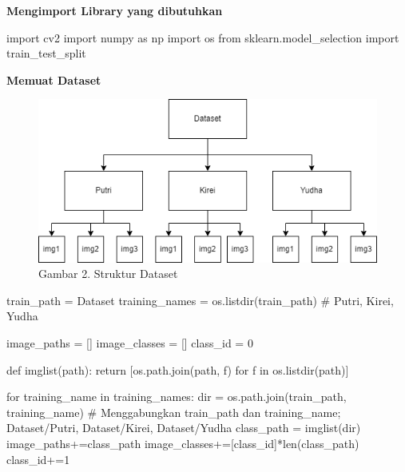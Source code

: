 \documentclass[
  letterpaper,
  DIV=11,
  numbers=noendperiod]{scrreprt}
\newenvironment{Shaded}{\begin{snugshade}}{\end{snugshade}}
\newcommand{\BuiltInTok}[1]{\textcolor[rgb]{0.00,0.23,0.31}{#1}}
\newcommand{\CommentTok}[1]{\textcolor[rgb]{0.37,0.37,0.37}{#1}}
\newcommand{\ControlFlowTok}[1]{\textcolor[rgb]{0.00,0.23,0.31}{#1}}
\newcommand{\DecValTok}[1]{\textcolor[rgb]{0.68,0.00,0.00}{#1}}
\newcommand{\ImportTok}[1]{\textcolor[rgb]{0.00,0.46,0.62}{#1}}
\newcommand{\KeywordTok}[1]{\textcolor[rgb]{0.00,0.23,0.31}{#1}}
\newcommand{\NormalTok}[1]{\textcolor[rgb]{0.00,0.23,0.31}{#1}}
\newcommand{\OperatorTok}[1]{\textcolor[rgb]{0.37,0.37,0.37}{#1}}
\newcommand{\StringTok}[1]{\textcolor[rgb]{0.13,0.47,0.30}{#1}}
\begin{document}
\textbf{Mengimport Library yang dibutuhkan}

\begin{Shaded}
\begin{Highlighting}[]
\ImportTok{import}\NormalTok{ cv2}
\ImportTok{import}\NormalTok{ numpy }\ImportTok{as}\NormalTok{ np}
\ImportTok{import}\NormalTok{ os}
\ImportTok{from}\NormalTok{ sklearn.model\_selection }\ImportTok{import}\NormalTok{ train\_test\_split}
\end{Highlighting}
\end{Shaded}

\textbf{Memuat Dataset}

\begin{figure}

{\centering \includegraphics{Asset/strukturdataset.png}

}

\caption{Gambar 2. Struktur Dataset}

\end{figure}

\begin{Shaded}
\begin{Highlighting}[]
\NormalTok{train\_path }\OperatorTok{=} \StringTok{\textquotesingle{}Dataset\textquotesingle{}}
\NormalTok{training\_names }\OperatorTok{=}\NormalTok{ os.listdir(train\_path) }\CommentTok{\# Putri, Kirei, Yudha}

\NormalTok{image\_paths }\OperatorTok{=}\NormalTok{ []}
\NormalTok{image\_classes }\OperatorTok{=}\NormalTok{ []}
\NormalTok{class\_id }\OperatorTok{=} \DecValTok{0}

\KeywordTok{def}\NormalTok{ imglist(path):    }
    \ControlFlowTok{return}\NormalTok{ [os.path.join(path, f) }\ControlFlowTok{for}\NormalTok{ f }\KeywordTok{in}\NormalTok{ os.listdir(path)]}

\ControlFlowTok{for}\NormalTok{ training\_name }\KeywordTok{in}\NormalTok{ training\_names:}
    \BuiltInTok{dir} \OperatorTok{=}\NormalTok{ os.path.join(train\_path, training\_name) }\CommentTok{\# Menggabungkan train\_path dan training\_name; Dataset/Putri, Dataset/Kirei, Dataset/Yudha}
\NormalTok{    class\_path }\OperatorTok{=}\NormalTok{ imglist(}\BuiltInTok{dir}\NormalTok{)}
\NormalTok{    image\_paths}\OperatorTok{+=}\NormalTok{class\_path}
\NormalTok{    image\_classes}\OperatorTok{+=}\NormalTok{[class\_id]}\OperatorTok{*}\BuiltInTok{len}\NormalTok{(class\_path)}
\NormalTok{    class\_id}\OperatorTok{+=}\DecValTok{1}
\end{Highlighting}
\end{Shaded}
\end{document}
